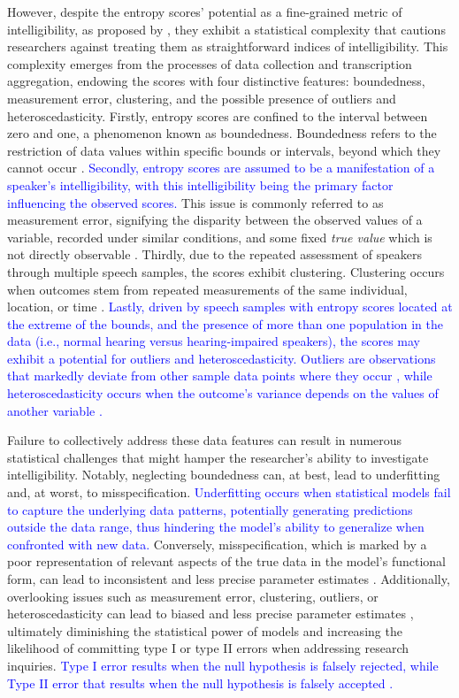\documentclass[
  authoryear,
  preprint,
  1p]{elsarticle}
\begin{document}
However, despite the entropy scores' potential as a fine-grained metric
of intelligibility, as proposed by \citet{Boonen_et_al_2023}, they
exhibit a statistical complexity that cautions researchers against
treating them as straightforward indices of intelligibility. This
complexity emerges from the processes of data collection and
transcription aggregation, endowing the scores with four distinctive
features: boundedness, measurement error, clustering, and the possible
presence of outliers and heteroscedasticity. Firstly, entropy scores are
confined to the interval between zero and one, a phenomenon known as
boundedness. Boundedness refers to the restriction of data values within
specific bounds or intervals, beyond which they cannot occur
\citep{Lebl_2022}. \textcolor{blue}{Secondly, entropy scores are assumed to be a
manifestation of a speaker's intelligibility, with this intelligibility
being the primary factor influencing the observed scores.} This issue is
commonly referred to as measurement error, signifying the disparity
between the observed values of a variable, recorded under similar
conditions, and some fixed \emph{true value} which is not directly
observable \citep{Everitt_et_al_2010}. Thirdly, due to the repeated
assessment of speakers through multiple speech samples, the scores
exhibit clustering. Clustering occurs when outcomes stem from repeated
measurements of the same individual, location, or time
\citep{McElreath_2020}. \textcolor{blue}{Lastly, driven by speech samples with entropy
scores located at the extreme of the bounds, and the presence of more
than one population in the data (i.e., normal hearing versus
hearing-impaired speakers), the scores may exhibit a potential for
outliers and heteroscedasticity. Outliers are observations that markedly
deviate from other sample data points where they occur
\citep{Grubbs_1969}, while heteroscedasticity occurs when the outcome's
variance depends on the values of another variable
\citep{Everitt_et_al_2010}.}

Failure to collectively address these data features can result in
numerous statistical challenges that might hamper the researcher's
ability to investigate intelligibility. Notably, neglecting boundedness
can, at best, lead to underfitting and, at worst, to misspecification.
\textcolor{blue}{Underfitting occurs when statistical models fail to capture the
underlying data patterns, potentially generating predictions outside the
data range, thus hindering the model's ability to generalize when
confronted with new data.} Conversely, misspecification, which is marked
by a poor representation of relevant aspects of the true data in the
model's functional form, can lead to inconsistent and less precise
parameter estimates \citep{Everitt_et_al_2010}. Additionally,
overlooking issues such as measurement error, clustering, outliers, or
heteroscedasticity can lead to biased and less precise parameter
estimates \citep{McElreath_2020}, ultimately diminishing the statistical
power of models and increasing the likelihood of committing type I or
type II errors when addressing research inquiries. \textcolor{blue}{Type I error results
when the null hypothesis is falsely rejected, while Type II error that
results when the null hypothesis is falsely accepted
\citep{Everitt_et_al_2010}.}
\end{document}
